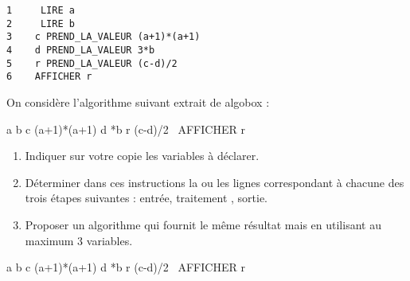 \documentclass[12pt,french]{report}
\begin{document}
\begin{lrbox}{\algorithme}
\begin{minipage}{0.5\linewidth}
\begin{verbatim}
1     LIRE a
2     LIRE b
3    c PREND_LA_VALEUR (a+1)*(a+1)
4    d PREND_LA_VALEUR 3*b
5    r PREND_LA_VALEUR (c-d)/2
6    AFFICHER r
\end{verbatim}
\end{minipage}
\end{lrbox}

\begin{question}[subtitle={(4 points)}]
On considère l'algorithme suivant extrait de algobox :

\begin{center}
\usebox\algorithme
\end{center}

\begin{algobox}

\;   \DEBUTALGORITHME
\;   \LIRE a
\;    \LIRE b
\;     c \PRENDLAVALEUR (a+1)*(a+1)
\;     d *b
\;    r \PRENDLAVALEUR (c-d)/2
\;    \ AFFICHER r
\;  \FINALGORITHME
\end{algobox}

\begin{enumerate}[label=\arabic*.]
	\item Indiquer sur votre copie les variables à déclarer.
	\item Déterminer dans ces instructions la ou les lignes correspondant à chacune des trois étapes suivantes : entrée, traitement , sortie.
	
\item  Proposer un algorithme qui fournit le même résultat mais en utilisant au maximum 3 variables.

\end{enumerate}
\end{question}

\begin{algobox}

\;   \DEBUTALGORITHME
\;   \LIRE a
\;    \LIRE b
\;     c \PRENDLAVALEUR (a+1)*(a+1)
\;     d *b
\;    r \PRENDLAVALEUR (c-d)/2
\;    \ AFFICHER r
\;  \FINALGORITHME
\end{algobox}

\end{document}
